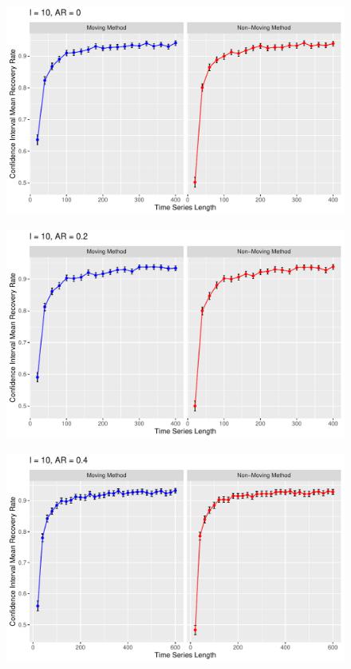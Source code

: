 \documentclass[12pt, letterpaper, titlepage]{article}
\begin{document}
\begin{figure}[tbp]
  \centering
  \includegraphics[width=\textwidth]{constant_0}
  \caption{}
  \label{fig:constant_norm}
\end{figure}

\begin{figure}[tbp]
  \centering
  \includegraphics[width=\textwidth]{constant_0.2}
  \caption{}
  \label{fig:constant_0.2}
\end{figure}

\begin{figure}[tbp]
  \centering
  \includegraphics[width=\textwidth]{constant_0.4}
  \caption{}
  \label{fig:constant_0.4}
\end{figure}
\end{document}
